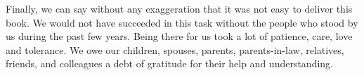 Finally, we can say without any exaggeration that it was not easy to deliver this book. We would not have succeeded in this task without the people who stood by us during the past few years. Being there for us took a lot of patience, care, love and tolerance. We owe our children, spouses, parents, parents-in-law, relatives, friends, and colleagues a debt of gratitude for their help and understanding.



